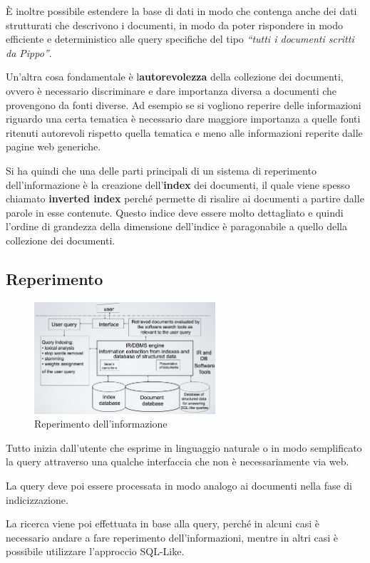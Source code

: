 \`E inoltre possibile estendere la base di dati in modo che contenga anche dei dati strutturati che descrivono i documenti, in modo da poter rispondere in modo efficiente e deterministico alle query specifiche del tipo \textit{``tutti i documenti scritti da Pippo''}.

Un'altra cosa fondamentale è l\textbf{autorevolezza} della collezione dei documenti, ovvero è necessario discriminare e dare importanza diversa a documenti che provengono da fonti diverse. Ad esempio se si vogliono reperire delle informazioni riguardo una certa tematica è necessario dare maggiore importanza a quelle fonti ritenuti autorevoli rispetto quella tematica e meno alle informazioni reperite dalle pagine web generiche.

Si ha quindi che una delle parti principali di un sistema di reperimento dell'informazione è la creazione dell'\textbf{index} dei documenti, il quale viene spesso chiamato \textbf{inverted index} perché permette di risalire ai documenti a partire dalle parole in esse contenute. 
Questo indice deve essere molto dettagliato e quindi l'ordine di grandezza della dimensione dell'indice è paragonabile a quello della collezione dei documenti.

\subsection{Reperimento}

\begin{figure}
	\centering
	\includegraphics[width=0.6\textwidth]{images/l2-reperimento.png}
	\caption{Reperimento dell'informazione}
\end{figure}

Tutto inizia dall'utente che esprime in linguaggio naturale o in modo semplificato la query attraverso una qualche interfaccia che non è necessariamente via web.

La query deve poi essere processata in modo analogo ai documenti nella fase di indicizzazione.

La ricerca viene poi effettuata in base alla query, perché in alcuni casi è necessario andare a fare reperimento dell'informazioni, mentre in altri casi è possibile utilizzare l'approccio SQL-Like.

